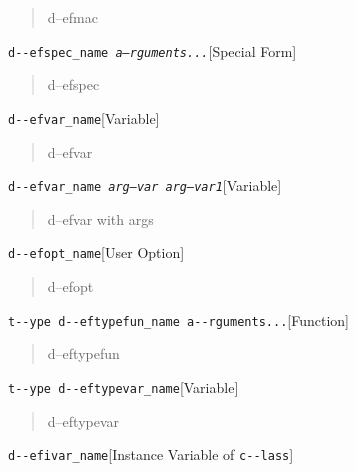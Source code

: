 \documentclass{book}
\begin{document}
\begin{titlepage}
%
\begin{quote}
\unskip{\parskip=0pt\noindent}%
d--efmac
\end{quote}

\noindent\texttt{d{-}{-}efspec\_name \EmbracOn{}\textnormal{\textsl{a--rguments...}}\EmbracOff{}}\hfill[Special Form]

%
\begin{quote}
\unskip{\parskip=0pt\noindent}%
d--efspec
\end{quote}

\noindent\texttt{d{-}{-}efvar\_name}\hfill[Variable]

%
\begin{quote}
\unskip{\parskip=0pt\noindent}%
d--efvar
\end{quote}

\noindent\texttt{d{-}{-}efvar\_name \EmbracOn{}\textnormal{\textsl{arg--var arg--var1}}\EmbracOff{}}\hfill[Variable]

%
\begin{quote}
\unskip{\parskip=0pt\noindent}%
d--efvar with args
\end{quote}

\noindent\texttt{d{-}{-}efopt\_name}\hfill[User Option]

%
\begin{quote}
\unskip{\parskip=0pt\noindent}%
d--efopt
\end{quote}

\noindent\texttt{t{-}{-}ype d{-}{-}eftypefun\_name a{-}{-}rguments...}\hfill[Function]

%
\begin{quote}
\unskip{\parskip=0pt\noindent}%
d--eftypefun
\end{quote}

\noindent\texttt{t{-}{-}ype d{-}{-}eftypevar\_name}\hfill[Variable]

%
\begin{quote}
\unskip{\parskip=0pt\noindent}%
d--eftypevar
\end{quote}

\noindent\texttt{d{-}{-}efivar\_name}\hfill[Instance Variable of \texttt{c{-}{-}lass}]


\end{titlepage}
\end{document}
